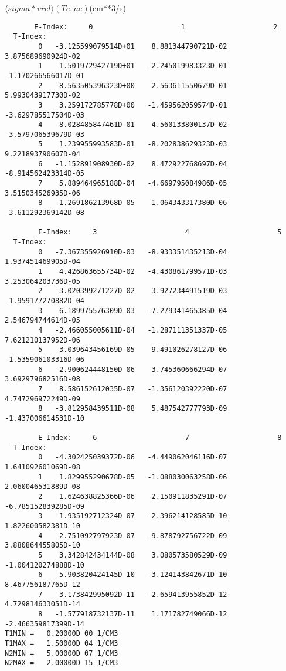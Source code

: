 \documentclass[12pt,dvipdfmx]{article}
\begin{document}
{$  \langle sigma*vrel \rangle(Te,ne) $(cm**3/s)
\begin{small}\begin{verbatim}
       E-Index:     0                     1                     2
  T-Index:
        0   -3.125599079514D+01    8.881344790721D-02    3.875689690924D-02
        1    1.501972942719D+01   -2.245019983323D-01   -1.170266566017D-01
        2   -8.563505396323D+00    2.563611550679D-01    5.993043917730D-02
        3    3.259172785778D+00   -1.459562059574D-01   -3.629785517504D-03
        4   -8.028485847461D-01    4.560133800137D-02   -3.579706539679D-03
        5    1.239955993583D-01   -8.202838629323D-03    9.221893790607D-04
        6   -1.152891908930D-02    8.472922768697D-04   -8.914562423314D-05
        7    5.889464965188D-04   -4.669795084986D-05    3.515034526935D-06
        8   -1.269186213968D-05    1.064343317380D-06   -3.611292369142D-08

        E-Index:     3                     4                     5
  T-Index:
        0   -7.367355926910D-03   -8.933351435213D-04    1.937451469905D-04
        1    4.426863655734D-02   -4.430861799571D-03    3.253064203736D-05
        2   -3.020399271227D-02    3.927234491519D-03   -1.959177270882D-04
        3    6.189975576309D-03   -7.279341465385D-04    2.546794744614D-05
        4   -2.466055005611D-04   -1.287111351337D-05    7.621210137952D-06
        5   -3.039643456169D-05    9.491026278127D-06   -1.535906103316D-06
        6   -2.900624448150D-06    3.745360666294D-07    3.692979682516D-08
        7    8.586152612035D-07   -1.356120392220D-07    4.747296972249D-09
        8   -3.812958439511D-08    5.487542777793D-09   -1.437006614531D-10

        E-Index:     6                     7                     8
  T-Index:
        0   -4.302425039372D-06   -4.449062046116D-07    1.641092601069D-08
        1    1.829955290678D-05   -1.088030063258D-06    2.060046531889D-08
        2    1.624638825366D-06    2.150911835291D-07   -6.785152839285D-09
        3   -1.935192712324D-07   -2.396214128585D-10    1.822600582381D-10
        4   -2.751092797923D-07   -9.878792756722D-09    3.880864455805D-10
        5    3.342842434144D-08    3.080573580529D-09   -1.004120274888D-10
        6    5.903820424145D-10   -3.124143842671D-10    8.467756187765D-12
        7    3.173842995092D-11   -2.659413955852D-12    4.729814633051D-14
        8   -1.577918732137D-11    1.171782749066D-12   -2.466359817399D-14
T1MIN =   0.20000D 00 1/CM3
T1MAX =   1.50000D 04 1/CM3
N2MIN =   5.00000D 07 1/CM3
N2MAX =   2.00000D 15 1/CM3


\end{verbatim}
\end{small}}
\end{document}

